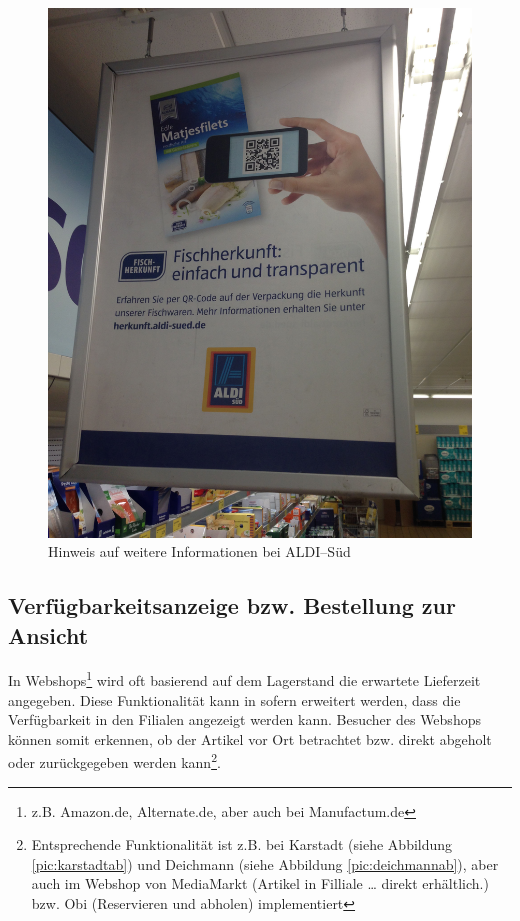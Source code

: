\hfill
\begin{minipage}[t]{0.4\textwidth}
\begin{figure}[H]
\begin{center}
\includegraphics[width=\textwidth]{ALDI-QR.jpg}
\caption{Hinweis auf weitere Informationen bei ALDI--Süd}
\label{pic:aldiqr}
\end{center}
\end{figure}
\end{minipage}

\subsection{Verfügbarkeitsanzeige bzw. Bestellung zur Ansicht}
\label{bza}

In Webshops\footnote{z.B. Amazon.de, Alternate.de, aber auch bei Manufactum.de} wird oft basierend auf dem Lagerstand die erwartete Lieferzeit angegeben. Diese Funktionalität kann in sofern erweitert werden, dass die Verfügbarkeit in den Filialen angezeigt werden kann. Besucher des Webshops können somit erkennen, ob der Artikel vor Ort betrachtet bzw. direkt abgeholt oder zurückgegeben werden kann\footnote{Entsprechende Funktionalität ist z.B. bei Karstadt (siehe Abbildung \ref{pic:karstadtab}) und Deichmann (siehe Abbildung \ref{pic:deichmannab}), aber auch im Webshop von MediaMarkt (Artikel in Filliale … direkt erhältlich.) bzw. Obi (Reservieren und abholen) implementiert}. 

